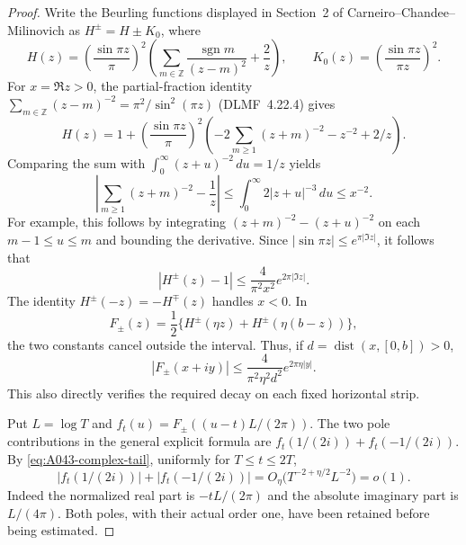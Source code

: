 \begin{proof}
Write the Beurling functions displayed in Section~2 of
Carneiro--Chandee--Milinovich as $H^\pm=H\pm K_0$, where
\[
 H(z)=\left(\frac{\sin\pi z}{\pi}\right)^2
       \left(\sum_{m\in\mathbb Z}
                \frac{\operatorname{sgn}m}{(z-m)^2}+\frac2z\right),
 \qquad K_0(z)=\left(\frac{\sin\pi z}{\pi z}\right)^2.
\]
For $x=\Re z>0$, the partial-fraction identity
$\sum_{m\in\mathbb Z}(z-m)^{-2}=\pi^2/\sin^2(\pi z)$
(DLMF~4.22.4) gives
\[
 H(z)=1+\left(\frac{\sin\pi z}{\pi}\right)^2
       \left(-2\sum_{m\ge1}(z+m)^{-2}-z^{-2}+2/z\right).
\]
Comparing the sum with
$\int_0^\infty(z+u)^{-2}\,du=1/z$ yields
\[
 \left|\sum_{m\ge1}(z+m)^{-2}-\frac1z\right|
 \le\int_0^\infty2|z+u|^{-3}\,du\le x^{-2}.
\]
For example, this follows by integrating
$(z+m)^{-2}-(z+u)^{-2}$ on each $m-1\le u\le m$
and bounding the derivative. Since
$|\sin\pi z|\le e^{\pi|\Im z|}$, it follows that
\[
 |H^\pm(z)-1|\le\frac4{\pi^2x^2}e^{2\pi|\Im z|}.
\]
The identity $H^\pm(-z)=-H^\mp(z)$ handles $x<0$.
In
\[
 F_\pm(z)=\frac12\{H^\pm(\eta z)+H^\pm(\eta(b-z))\},
\]
the two constants cancel outside the interval. Thus, if
$d=\operatorname{dist}(x,[0,b])>0$,
\begin{equation}\label{eq:A043-complex-tail}
 |F_\pm(x+iy)|\le\frac4{\pi^2\eta^2d^2}e^{2\pi\eta|y|}.
\end{equation}
This also directly verifies the required decay on each fixed
horizontal strip.

Put $L=\log T$ and
$f_t(u)=F_\pm((u-t)L/(2\pi))$.
The two pole contributions in the general explicit formula
are $f_t(1/(2i))+f_t(-1/(2i))$. By
\eqref{eq:A043-complex-tail}, uniformly for $T\le t\le2T$,
\begin{equation}\label{eq:A043-poles}
 |f_t(1/(2i))|+|f_t(-1/(2i))|
       =O_\eta\bigl(T^{-2+\eta/2}L^{-2}\bigr)=o(1).
\end{equation}
Indeed the normalized real part is $-tL/(2\pi)$ and the
absolute imaginary part is $L/(4\pi)$. Both poles, with their
actual order one, have been retained before being estimated.


\end{proof}

